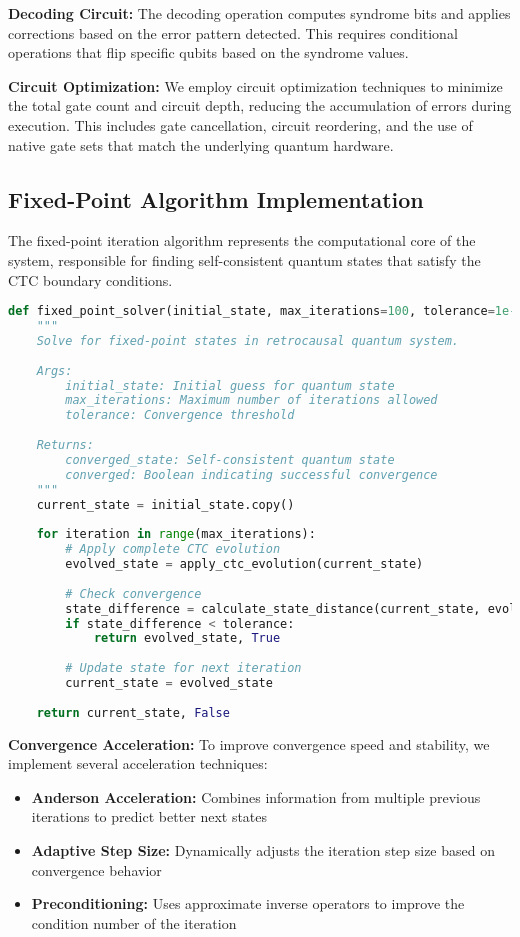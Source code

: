 \documentclass[12pt,a4paper]{article}
\begin{document}
\textbf{Decoding Circuit:} The decoding operation computes syndrome bits and applies corrections based on the error pattern detected. This requires conditional operations that flip specific qubits based on the syndrome values.

\textbf{Circuit Optimization:} We employ circuit optimization techniques to minimize the total gate count and circuit depth, reducing the accumulation of errors during execution. This includes gate cancellation, circuit reordering, and the use of native gate sets that match the underlying quantum hardware.

\subsection{Fixed-Point Algorithm Implementation}

The fixed-point iteration algorithm represents the computational core of the system, responsible for finding self-consistent quantum states that satisfy the CTC boundary conditions.

\begin{lstlisting}[language=Python, caption=Fixed-Point Solver Algorithm]
def fixed_point_solver(initial_state, max_iterations=100, tolerance=1e-6):
    """
    Solve for fixed-point states in retrocausal quantum system.
    
    Args:
        initial_state: Initial guess for quantum state
        max_iterations: Maximum number of iterations allowed
        tolerance: Convergence threshold
    
    Returns:
        converged_state: Self-consistent quantum state
        converged: Boolean indicating successful convergence
    """
    current_state = initial_state.copy()
    
    for iteration in range(max_iterations):
        # Apply complete CTC evolution
        evolved_state = apply_ctc_evolution(current_state)
        
        # Check convergence
        state_difference = calculate_state_distance(current_state, evolved_state)
        if state_difference < tolerance:
            return evolved_state, True
        
        # Update state for next iteration
        current_state = evolved_state
    
    return current_state, False
\end{lstlisting}

\textbf{Convergence Acceleration:} To improve convergence speed and stability, we implement several acceleration techniques:
\begin{itemize}
\item \textbf{Anderson Acceleration:} Combines information from multiple previous iterations to predict better next states
\item \textbf{Adaptive Step Size:} Dynamically adjusts the iteration step size based on convergence behavior
\item \textbf{Preconditioning:} Uses approximate inverse operators to improve the condition number of the iteration
\end{itemize}
\end{document}
